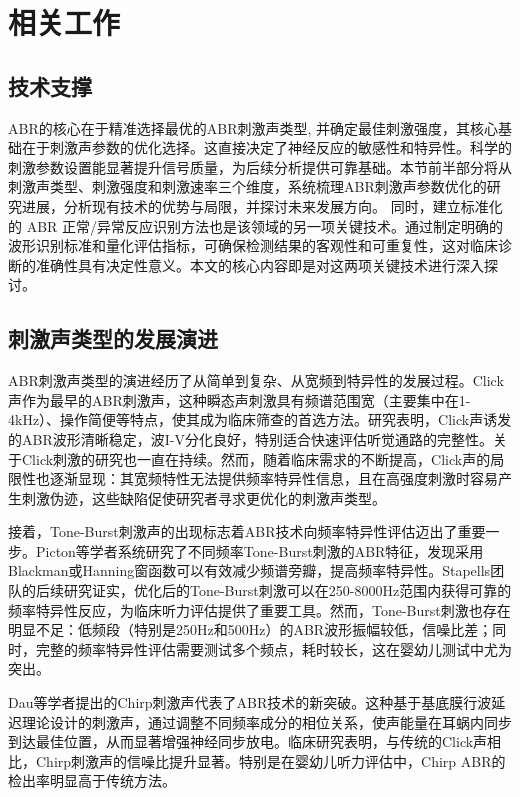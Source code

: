 \chapter{相关工作}

\section{技术支撑}
ABR的核心在于精准选择最优的ABR刺激声类型, 并确定最佳刺激强度，其核心基础在于刺激声参数的优化选择。这直接决定了神经反应的敏感性和特异性。科学的刺激参数设置能显著提升信号质量，为后续分析提供可靠基础。本节前半部分将从刺激声类型、刺激强度和刺激速率三个维度，系统梳理ABR刺激声参数优化的研究进展，分析现有技术的优势与局限，并探讨未来发展方向。
同时，建立标准化的 ABR 正常/异常反应识别方法也是该领域的另一项关键技术。通过制定明确的波形识别标准和量化评估指标，可确保检测结果的客观性和可重复性，这对临床诊断的准确性具有决定性意义。本文的核心内容即是对这两项关键技术进行深入探讨。

\section{刺激声类型的发展演进}
ABR刺激声类型的演进经历了从简单到复杂、从宽频到特异性的发展过程。Click声作为最早的ABR刺激声，这种瞬态声刺激具有频谱范围宽（主要集中在1-4kHz）、操作简便等特点，使其成为临床筛查的首选方法。研究表明，Click声诱发的ABR波形清晰稳定，波I-V分化良好，特别适合快速评估听觉通路的完整性。关于Click刺激的研究也一直在持续\cite{rocha2024click,lee2021paired,talge2018click,frontiers2024apd}。然而，随着临床需求的不断提高，Click声的局限性也逐渐显现：其宽频特性无法提供频率特异性信息，且在高强度刺激时容易产生刺激伪迹，这些缺陷促使研究者寻求更优化的刺激声类型。


接着，Tone-Burst\cite{orsini2004notched,rasetshwane2013latency,diao2011filter,search2008toneassr}刺激声的出现标志着ABR技术向频率特异性评估迈出了重要一步。Picton等学者\cite{picton1981auditory}系统研究了不同频率Tone-Burst刺激的ABR特征，发现采用Blackman或Hanning窗函数可以有效减少频谱旁瓣，提高频率特异性。Stapells团队\cite{stapells2000meta}的后续研究证实，优化后的Tone-Burst刺激可以在250-8000Hz范围内获得可靠的频率特异性反应，为临床听力评估提供了重要工具。然而，Tone-Burst刺激也存在明显不足：低频段（特别是250Hz和500Hz）的ABR波形振幅较低，信噪比差；同时，完整的频率特异性评估需要测试多个频点，耗时较长，这在婴幼儿测试中尤为突出。


Dau等学者\cite{dau2000optimized}提出的Chirp刺激声\cite{ceylan2025_nbcechirp,chirp_bic2023,derived2022_tailoredchirp}代表了ABR技术的新突破。这种基于基底膜行波延迟理论设计的刺激声，通过调整不同频率成分的相位关系，使声能量在耳蜗内同步到达最佳位置，从而显著增强神经同步放电。临床研究表明，与传统的Click声相比，Chirp刺激声的信噪比提升显著\cite{fobel2004optimal}。特别是在婴幼儿听力评估中，Chirp ABR的检出率明显高于传统方法\cite{vanmaanen2013chirp,gorga2017chirp}。

